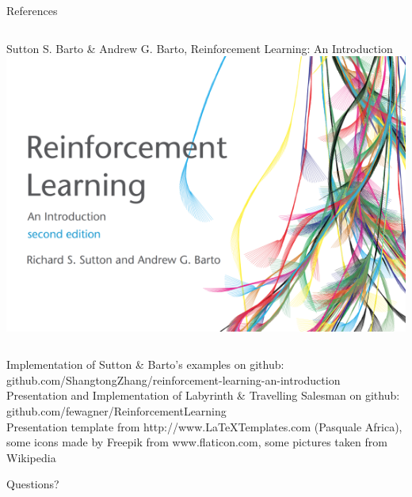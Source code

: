 \documentclass{beamer}
\begin{document}

\begin{frame}{References}
	\begin{columns}
	Sutton S. Barto \& Andrew G. Barto, Reinforcement Learning: An Introduction
	\includegraphics[width=\linewidth]{Images/suttonbarto.png}\\	
	\end{columns}
	\vspace{0.2cm}
	Implementation of Sutton \& Barto's examples on github: \\
	github.com/ShangtongZhang/reinforcement-learning-an-introduction\\
	\vspace{0.2cm}
	Presentation and Implementation of Labyrinth \& Travelling Salesman on github:
	github.com/fewagner/ReinforcementLearning \\
	\vspace{0.2cm} 
	Presentation template from http://www.LaTeXTemplates.com (Pasquale Africa), some icons made by Freepik from www.flaticon.com, some pictures taken from Wikipedia
\end{frame}

\begin{frame}[focus]
	Questions?
\end{frame}

\appendix
\end{document}

